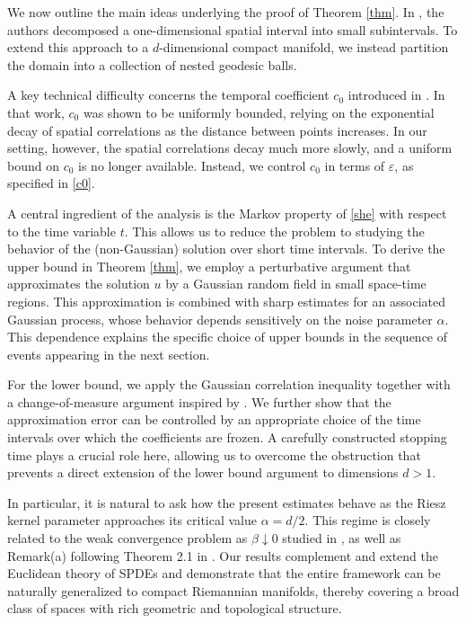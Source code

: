 \documentclass[12pt]{amsart}
\numberwithin{equation}{section}
\newcommand{\1}{\mathbf{1}}
\begin{document}
We now outline the main ideas underlying the proof of Theorem \ref{thm}. In \cite{athreya2021small}, the authors decomposed a one-dimensional spatial interval into small subintervals. To extend this approach to a $d$-dimensional compact manifold, we instead partition the domain into a collection of nested geodesic balls.

A key technical difficulty concerns the temporal coefficient $c_0$ introduced in \cite{athreya2021small}. In that work, $c_0$ was shown to be uniformly bounded, relying on the exponential decay of spatial correlations as the distance between points increases. In our setting, however, the spatial correlations decay much more slowly, and a uniform bound on $c_0$ is no longer available. Instead, we control $c_0$ in terms of $\varepsilon$, as specified in \eqref{c0}.

A central ingredient of the analysis is the Markov property of \eqref{she} with respect to the time variable $t$. This allows us to reduce the problem to studying the behavior of the (non-Gaussian) solution over short time intervals. To derive the upper bound in Theorem \ref{thm}, we employ a perturbative argument that approximates the solution $u$ by a Gaussian random field in small space-time regions. This approximation is combined with sharp estimates for an associated Gaussian process, whose behavior depends sensitively on the noise parameter $\alpha$. This dependence explains the specific choice of upper bounds in the sequence of events appearing in the next section.

For the lower bound, we apply the Gaussian correlation inequality together with a change-of-measure argument inspired by \cite{athreya2021small}. We further show that the approximation error can be controlled by an appropriate choice of the time intervals over which the coefficients are frozen. A carefully constructed stopping time plays a crucial role here, allowing us to overcome the obstruction that prevents a direct extension of the lower bound argument to dimensions $d>1$.

In particular, it is natural to ask how the present estimates behave as the Riesz kernel parameter approaches its critical value $\alpha=d/2$. This regime is closely related to the weak convergence problem as $\beta\downarrow 0$ studied in \cite{bezdek2016weak}, as well as Remark(a) following Theorem 2.1 in \cite{chen2024small}. Our results complement and extend the Euclidean theory of SPDEs and demonstrate that the entire framework can be naturally generalized to compact Riemannian manifolds, thereby covering a broad class of spaces with rich geometric and topological structure.
\end{document}
